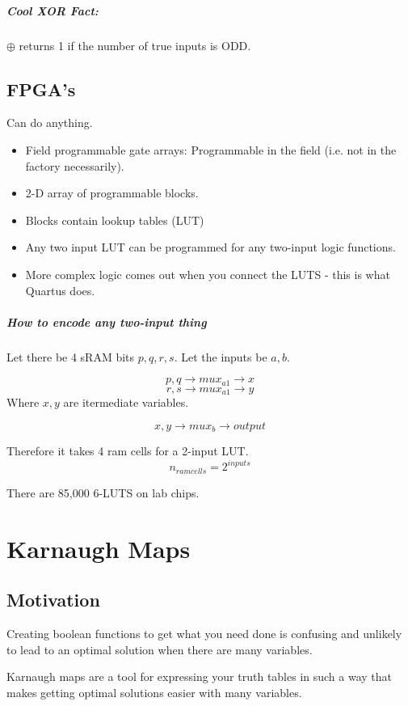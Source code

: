 \documentclass[a4paper,12pt]{report}
\begin{document}
\paragraph{Cool XOR Fact: } $\oplus$ returns 1 if the number of true inputs is ODD.

\section{FPGA's}
Can do anything.
\begin{itemize}
\item Field programmable gate arrays: Programmable in the field (i.e. not in the factory necessarily).
\item 2-D array of programmable blocks.
\item Blocks contain lookup tables (LUT)
\item Any two input LUT can be programmed for any two-input logic functions.
\item More complex logic comes out when you connect the LUTS - this is what Quartus does. 
\end{itemize}

\paragraph{How to encode any two-input thing}
Let there be 4 sRAM bits $p, q, r, s$. Let the inputs be $a, b$. 

$${p, q} \to mux_{a1} \to x$$
$${r, s} \to mux_{a1} \to y$$
Where $x, y$ are itermediate variables.

$${x, y} \to mux_{b} \to output$$

Therefore it takes 4 ram cells for a 2-input LUT. $$n_{ramcells} = 2^{inputs}$$

There are 85,000 6-LUTS on lab chips.

\chapter{Karnaugh Maps}
\section{Motivation}
Creating boolean functions to get what you need done is confusing and unlikely to lead to an optimal solution 
when there are many variables.

Karnaugh maps are a tool for expressing your truth tables in such a way that makes getting optimal solutions easier
with many variables.
\end{document}
